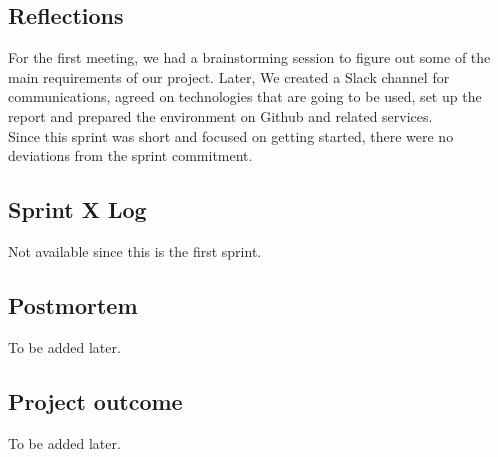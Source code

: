 \documentclass[14]{article}
\begin{document}
\subsection{Reflections}
For the first meeting, we had a brainstorming session to figure out some of the main requirements of our project. Later, We created a Slack channel for communications, agreed on technologies that are going to be used, set up the report and prepared the environment on Github and related services.\\
Since this sprint was short and focused on getting started, there were no deviations from the sprint commitment.

\subsection{Sprint X Log}
Not available since this is the first sprint.

\subsection{Postmortem}
To be added later.

\subsection{Project outcome}
To be added later.
\end{document}
